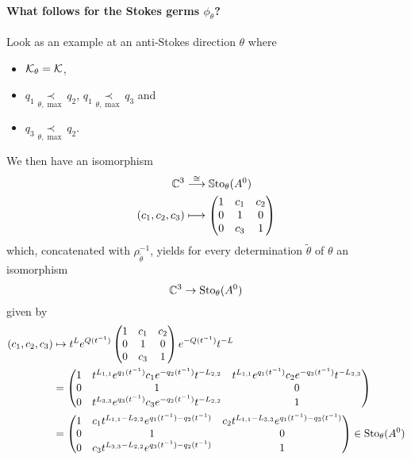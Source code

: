 \paragraph{What follows for the Stokes germs $\phi_\theta$?}
Look as an example at an anti-Stokes direction $\theta$ where
\begin{itemize}
  \item $\mathcal{K}_{\theta}=\mathcal{K}$,
  \item $q_1 \underset{\theta,\max}{\prec} q_2$,
    $q_1 \underset{\theta,\max}{\prec} q_3$ and
  \item $q_3 \underset{\theta,\max}{\prec} q_2$.
\end{itemize}
We then have an isomorphism
\begin{align*}
  \mathbb{C}^3 &\overset\cong\longrightarrow \operatorname{\mathbb{S}to}_\theta(A^0)
\\(c_1,c_2,c_3) &\longmapsto
  \begin{pmatrix}
    1     & c_1 & c_2
  \\0     & 1     & 0
  \\0     & c_3 & 1
  \end{pmatrix}
\end{align*}
which, concatenated with $\rho_{\tilde\theta}^{-1}$, yields for every
determination $\tilde\theta$ of $\theta$ an isomorphism
\[
  \mathbb{C}^3\to\operatorname{Sto}_\theta(A^0)
\]
given by
\begin{align*}
  (c_1,c_2,c_3) &\mapsto
  t^{L}e^{Q(t^{-1})}
  \begin{pmatrix}
    1     & c_1 & c_2
  \\0     & 1     & 0
  \\0     & c_3 & 1
  \end{pmatrix}
  e^{-Q(t^{-1})}t^{-L}
\\&=
  \begin{pmatrix}
    1
    & t^{L_{1,1}}e^{q_1(t^{-1})}c_1 e^{-q_2(t^{-1})}t^{-L_{2,2}}
    & t^{L_{1,1}}e^{q_1(t^{-1})}c_2 e^{-q_3(t^{-1})}t^{-L_{3,3}}
    \\0     & 1     & 0
    \\0
    & t^{L_{3,3}}e^{q_3(t^{-1})}c_3 e^{-q_2(t^{-1})}t^{-L_{2,2}}
    & 1
  \end{pmatrix}
\\&=
  \begin{pmatrix}
    1
    & c_1 t^{L_{1,1}-L_{2,2}}e^{q_1(t^{-1})-q_2(t^{-1})}
    & c_2 t^{L_{1,1}-L_{3,3}}e^{q_1(t^{-1})-q_3(t^{-1})}
    \\0     & 1     & 0
    \\0
    & c_3 t^{L_{3,3}-L_{2,2}}e^{q_3(t^{-1})-q_2(t^{-1})}
    & 1
  \end{pmatrix}
  \in\operatorname{Sto}_\theta(A^0)
\end{align*}

